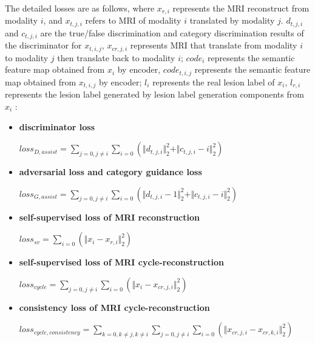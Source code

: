 \documentclass[letterpaper]{article} %
\begin{document}
The detailed losses are as follows, where $x_{r,i}$ represents the MRI reconstruct from modality $i$, and $x_{t,j,i}$ refers to MRI of modality $i$ translated by modality $j$. $d_{t, j, i}$ and $c_{t, j, i}$ are the true/false discrimination and category discrimination results of the discriminator for $x_{t, i, j}$, $x_{cr,j,i}$ represents MRI that translate from modality $i$ to modality $j$ then translate back to modality $i$; $code_i$ represents the semantic feature map obtained from $x_i$ by encoder, $code_{t,i,j}$ represents the semantic feature map obtained from $x_{t,i,j}$ by encoder; $l_i$ represents the real lesion label of $x_i$, $l_{r,i}$ represents the lesion label generated by lesion label generation components from $x_i$ :

\begin{itemize}
	\item \textbf{discriminator loss}
	\begin{center}
		$loss_{D,assist}=\sum\limits_{j=0,j\neq i}\sum\limits_{i=0}(\Vert{d_{t,j,i}}\Vert_{2}^{2}+\Vert{c_{t,j,i}-i}\Vert_{2}^{2})$
	\end{center}
	
	\item \textbf{adversarial loss and category guidance loss}
	\begin{center}
		$loss_{G,assist}=\sum\limits_{j=0,j\neq i}\sum\limits_{i=0}(\Vert{d_{t,j,i}-1}\Vert_{2}^{2}+\Vert{c_{t,j,i}-i}\Vert_{2}^{2})$
	\end{center}
	
	\item \textbf{self-supervised loss of MRI reconstruction}
	\begin{center}
		$loss_{sv}=\sum\limits_{i=0}(\Vert{x_i-x_{r,i}}\Vert_{2}^{2})$
	\end{center}
	
	\item \textbf{self-supervised loss of MRI cycle-reconstruction}
	
	\begin{center}
		$loss_{cycle}=\sum\limits_{j=0,j\neq i}\sum\limits_{i=0}(\Vert{x_i-x_{cr,j,i}}\Vert_{2}^{2})$
	\end{center}
	
	\item \textbf{consistency loss of MRI cycle-reconstruction}
	\begin{center}
		$loss_{cycle,consistency}=\sum\limits_{k=0,k\neq j,k\neq i}\sum\limits_{j=0,j\neq i}\sum\limits_{i=0}(\Vert{x_{cr,j,i}-x_{cr,k,i}}\Vert_{2}^{2})$
	\end{center}
	

\end{itemize}
\end{document}
